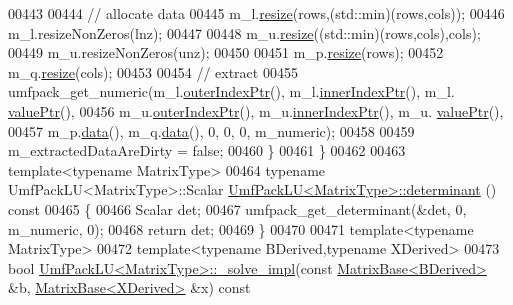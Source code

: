 \begin{DoxyCode}
00443 
00444     \textcolor{comment}{// allocate data}
00445     m\_l.\hyperlink{group___sparse_core___module_af88551f30202341b7cc24cfadabdec5c}{resize}(rows,(std::min)(rows,cols));
00446     m\_l.resizeNonZeros(lnz);
00447 
00448     m\_u.\hyperlink{group___sparse_core___module_af88551f30202341b7cc24cfadabdec5c}{resize}((std::min)(rows,cols),cols);
00449     m\_u.resizeNonZeros(unz);
00450 
00451     m\_p.\hyperlink{class_eigen_1_1_plain_object_base_a99d9054ee2d5a40c6e00ded0265e9cea}{resize}(rows);
00452     m\_q.\hyperlink{class_eigen_1_1_plain_object_base_a99d9054ee2d5a40c6e00ded0265e9cea}{resize}(cols);
00453 
00454     \textcolor{comment}{// extract}
00455     umfpack\_get\_numeric(m\_l.\hyperlink{group___sparse_core___module_a75506964d86d6badb32d0b4917acf2e2}{outerIndexPtr}(), m\_l.\hyperlink{group___sparse_core___module_ae7b804bd39745156d20ca1611a296b67}{innerIndexPtr}(), m\_l.
      \hyperlink{group___sparse_core___module_a9d4354d3f4d121d764bbed33cac05329}{valuePtr}(),
00456                         m\_u.\hyperlink{group___sparse_core___module_a75506964d86d6badb32d0b4917acf2e2}{outerIndexPtr}(), m\_u.\hyperlink{group___sparse_core___module_ae7b804bd39745156d20ca1611a296b67}{innerIndexPtr}(), m\_u.
      \hyperlink{group___sparse_core___module_a9d4354d3f4d121d764bbed33cac05329}{valuePtr}(),
00457                         m\_p.\hyperlink{class_eigen_1_1_plain_object_base_ac25699535374b1854cf8494e44ad31b2}{data}(), m\_q.\hyperlink{class_eigen_1_1_plain_object_base_ac25699535374b1854cf8494e44ad31b2}{data}(), 0, 0, 0, m\_numeric);
00458 
00459     m\_extractedDataAreDirty = \textcolor{keyword}{false};
00460   \}
00461 \}
00462 
00463 \textcolor{keyword}{template}<\textcolor{keyword}{typename} MatrixType>
00464 \textcolor{keyword}{typename} UmfPackLU<MatrixType>::Scalar \hyperlink{class_eigen_1_1_umf_pack_l_u}{UmfPackLU<MatrixType>::determinant}
      ()\textcolor{keyword}{ const}
00465 \textcolor{keyword}{}\{
00466   Scalar det;
00467   umfpack\_get\_determinant(&det, 0, m\_numeric, 0);
00468   \textcolor{keywordflow}{return} det;
00469 \}
00470 
00471 \textcolor{keyword}{template}<\textcolor{keyword}{typename} MatrixType>
00472 \textcolor{keyword}{template}<\textcolor{keyword}{typename} BDerived,\textcolor{keyword}{typename} XDerived>
00473 \textcolor{keywordtype}{bool} \hyperlink{class_eigen_1_1_umf_pack_l_u}{UmfPackLU<MatrixType>::\_solve\_impl}(\textcolor{keyword}{const} 
      \hyperlink{group___core___module_class_eigen_1_1_matrix_base}{MatrixBase<BDerived>} &b, \hyperlink{group___core___module_class_eigen_1_1_matrix_base}{MatrixBase<XDerived>} &x)\textcolor{keyword}{ const}

\end{DoxyCode}

